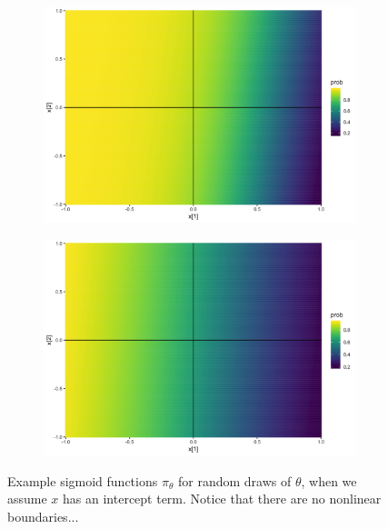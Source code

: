 \documentclass[10pt,mathserif]{beamer}
\begin{document}
\begin{frame}
\begin{figure}
\begin{subfigure}{.17\paperwidth}
    \end{subfigure}
    \begin{subfigure}{.17\paperwidth}
      \centering
      \includegraphics[width=0.17\paperwidth]{figure/sigmoid_plot_9}
    \end{subfigure}
    \begin{subfigure}{.17\paperwidth}
      \centering
      \includegraphics[width=0.17\paperwidth]{figure/sigmoid_plot_10}
    \end{subfigure}
    \caption{Example sigmoid functions $\pi_{\theta}$ for random draws of
      $\theta$, when we assume $x$ has an intercept term. Notice that there are
      no nonlinear boundaries...
      \label{fig:logistic_scatter_nonlinear} }
  \end{figure}
\end{frame}
\end{document}
